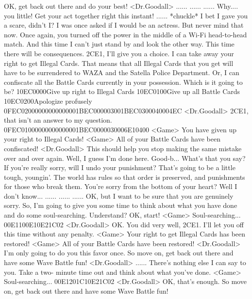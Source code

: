 OK, get back out there and do your best! 
<Dr.Goodall> ...... 
...... ...... 
Why.... you little! Get your act together right this instant! ......  
*chuckle* I bet I gave you a scare, didn't I? 
I was once asked if I would be an actress. 
But never mind that now. 
Once again, you turned off the power in the 
middle of a Wi-Fi head-to-head match. 
And this time I can't just stand by and look the other way. 
This time there will be consequences. {2C}{E1}, I'll give you a choice. 
I can take away your right to get Illegal Cards. 
That means that all Illegal Cards that you get will have to be 
surrendered to WAZA and the Satella Police Department. Or, 
I can confiscate all the Battle Cards currently in your possession. 
Which is it going to be? {10}{EC}{00}{00}Give up right to Illegal Cards {10}{EC}{01}{00}Give up all Battle Cards {10}{EC}{02}{00}Apologize profusely {0F}{EC}{02}{00}{00}{00}{00}{00}{00}{00}{1B}{EC}{00}{00}{03}{00}{1B}{EC}{03}{00}{04}{00}{04}{EC} 
<Dr.Goodall> {2C}{E1}, that isn't an answer to my question. {0F}{EC}{01}{00}{00}{00}{00}{00}{00}{00}{1B}{EC}{00}{00}{03}{00}{06}{E1}{04}{00}
<Game> You have given up your right to Illegal Cards! 
<Game> All of your Battle Cards have been confiscated! 
<Dr.Goodall> This should help you stop making the same mistake over and over again. 
Well, I guess I'm done here. 
Good-b... What's that you say? 
If you're really sorry, will I undo your punishment? 
That's going to be a little tough, youngin'. 
The world has rules so that order is preserved, 
and punishments for those who break them. 
You're sorry from the bottom of your heart? 
Well I don't know... 
...... 
...... 
...... 
OK, but I want to be sure that you are genuinely sorry. 
So, I'm going to give you some time to think about what you have done 
and do some soul-searching. 
Understand? 
OK, start! 
<Game> Soul-searching... {00}{E1}{10}{0E}{10}{E2}{1C}{02}
<Dr.Goodall> OK. You did very well, {2C}{E1}. I'll let you off this time without any penalty. 
<Game> Your right to get Illegal Cards has been restored! 
<Game> All of your Battle Cards have been restored! 
<Dr.Goodall> I'm only going to do you this favor once. 
So move on, get back out there and have some Wave Battle fun! 
<Dr.Goodall> ...... 
There's nothing else I can say to you. Take a two- 
minute time out and think about what you've done. 
<Game> Soul-searching... {00}{E1}{20}{1C}{10}{E2}{1C}{02}
<Dr.Goodall> OK, that's enough. 
So move on, get back out there and have some Wave Battle fun! 
